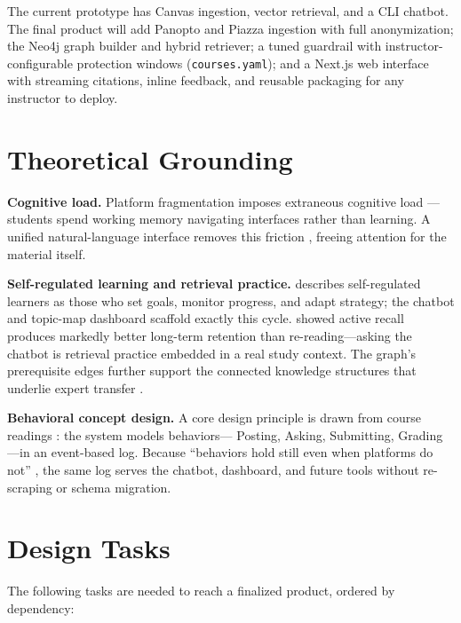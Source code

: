 \documentclass[12pt]{article}
\begin{document}
The current prototype has Canvas ingestion, vector retrieval, and a CLI
chatbot. The final product will add Panopto and Piazza ingestion with full
anonymization; the Neo4j graph builder and hybrid retriever; a tuned guardrail
with instructor-configurable protection windows (\texttt{courses.yaml}); and a
Next.js web interface with streaming citations, inline feedback, and reusable
packaging for any instructor to deploy.

\section{Theoretical Grounding}

\textbf{Cognitive load.} Platform fragmentation imposes extraneous cognitive
load \parencite{sweller1988}---students spend working memory navigating
interfaces rather than learning. A unified natural-language interface removes
this friction \parencite{mayer2009}, freeing attention for the material itself.

\textbf{Self-regulated learning and retrieval practice.} \textcite{zimmerman2002}
describes self-regulated learners as those who set goals, monitor progress, and
adapt strategy; the chatbot and topic-map dashboard scaffold exactly this cycle.
\textcite{roediger2006} showed active recall produces markedly better long-term
retention than re-reading---asking the chatbot is retrieval practice embedded in
a real study context. The graph's prerequisite edges further support the
connected knowledge structures that underlie expert transfer \parencite{chi1981}.

\textbf{Behavioral concept design.} A core design principle is drawn from
course readings \parencite{cms594staff2025}: the system models behaviors---
Posting, Asking, Submitting, Grading---in an event-based log. Because
``behaviors hold still even when platforms do not''
\parencite[p.~1]{cms594staff2025}, the same log serves the chatbot,
dashboard, and future tools without re-scraping or schema migration.

\section{Design Tasks}

The following tasks are needed to reach a finalized product, ordered by
dependency:
\end{document}
